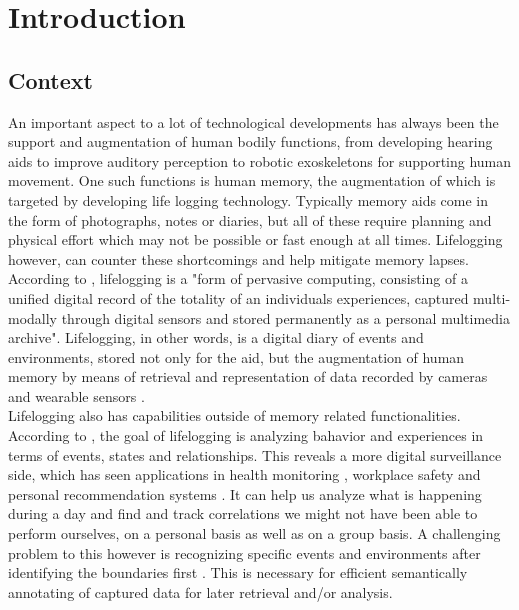 \chapter{Introduction}

\section{Context}

An important aspect to a lot of technological developments has always been the support and augmentation of human bodily functions, from developing hearing aids to improve auditory perception to robotic exoskeletons for supporting human movement. One such functions is human memory, the augmentation of which is targeted by developing life logging technology. Typically memory aids come in the form of photographs, notes or diaries, but all of these require planning and physical effort which may not be possible or fast enough at all times. Lifelogging however, can counter these shortcomings and help mitigate memory lapses. According to \citet{harvey2016remembering}, lifelogging is a "form of pervasive computing, consisting of a unified digital record of the totality of an individuals experiences, captured multi-modally through digital sensors and stored permanently as a personal multimedia archive". Lifelogging, in other words, is a digital diary of events and environments, stored not only for the aid, but the augmentation of human memory by means of retrieval and representation of data recorded by cameras and wearable sensors \cite{harvey2016remembering}.\\

Lifelogging also has capabilities outside of memory related functionalities. According to \citet{tzelepis2016event}, the goal of lifelogging is analyzing bahavior and experiences in terms of events, states and relationships. This reveals a more digital surveillance side, which has seen applications in health monitoring \cite{hamid2017survey}, workplace safety \cite{lee2020evidence} and personal recommendation systems \cite{yamano2009browsing}. It can help us analyze what is happening during a day and find and track correlations we might not have been able to perform ourselves, on a personal basis as well as on a group basis. A challenging problem to this however is recognizing specific events and environments after identifying the boundaries first \cite{tzelepis2016event}. This is necessary for efficient semantically annotating of captured data for later retrieval and/or analysis.\\

